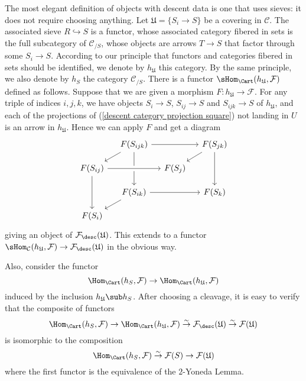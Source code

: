 The most elegant definition of objects with descent data is one that uses sieves: it does not require choosing anything. Let $\mathfrak{U}=\{S_i\to S\}$ be a covering in $\mathcal{C}$. The associated sieve $R\hookrightarrow S$ is a functor, whose associated category fibered in sets is the full subcategory of $\mathcal{C}_{/S}$, whose objects are arrows $T\to S$ that factor through some $S_i\to S$. According to our principle that functors and categories fibered in sets should be identified, we denote by $h_\mathfrak{U}$ this category. By the same principle, we also denote by $h_S$ the category $\mathcal{C}_{/S}$. There is a functor $\sHom_{\Cart}(h_\mathfrak{U},\mathcal{F})$ defined as follows. Suppose that we are given a morphism $F:h_\mathfrak{U}\to\mathcal{F}$. For any triple of indices $i,j,k$, we have objects $S_i\to S$, $S_{ij}\to S$ and $S_{ijk}\to S$ of $h_\mathfrak{U}$, and each of the projections of (\ref{descent category projection square}) not landing in $U$ is an arrow in $h_\mathfrak{U}$. Hence we can apply $F$ and get a diagram
\[\begin{tikzcd}[row sep=4mm,column sep=4mm]
&F(S_{ijk})\ar[rr]\ar[dd]\ar[ld]&&F(S_{jk})\ar[dd]\ar[ld]\\
F(S_{ij})\ar[dd]\ar[rr,crossing over]&&F(S_j)&\\
&F(S_{ik})\ar[ld]\ar[rr]&&F(S_k)\\
F(S_i)&&
\end{tikzcd}\]
giving an object of $\mathcal{F}_{\desc}(\mathfrak{U})$. This extends to a functor $\sHom_{\mathcal{C}}(h_\mathfrak{U},\mathcal{F})\to\mathcal{F}_{\desc}(\mathfrak{U})$ in the obvious way.\par
Also, consider the functor 
\[\Hom_{\Cart}(h_S,\mathcal{F})\to\Hom_{\Cart}(h_\mathfrak{U},\mathcal{F})\]
induced by the inclusion $h_\mathfrak{U}\sub h_S$. After choosing a cleavage, it is easy to verify that the composite of functors
\[\Hom_{\Cart}(h_S,\mathcal{F})\to \Hom_{\Cart}(h_\mathfrak{U},\mathcal{F})\stackrel{\sim}{\to} \mathcal{F}_{\desc}(\mathfrak{U})\stackrel{\sim}{\to} \mathcal{F}(\mathfrak{U})\]
is isomorphic to the composition
\[\Hom_{\Cart}(h_S,\mathcal{F})\stackrel{\sim}{\to} \mathcal{F}(S)\to\mathcal{F}(\mathfrak{U})\]
where the first functor is the equivalence of the $2$-Yoneda Lemma.

